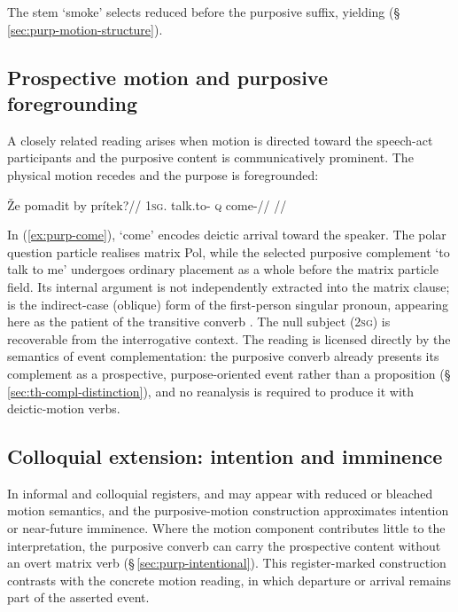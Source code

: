 The stem  `smoke' selects reduced  before the
purposive suffix, yielding  (§\,\ref{sec:purp-motion-structure}).

\subsection{Prospective motion and purposive
foregrounding}\label{sec:purp-motion-prospective}

A closely related reading arises when motion is directed toward the speech-act
participants and the purposive content is communicatively prominent. The
physical motion recedes and the purpose is foregrounded:

\ex\label{ex:purp-come}%
\begingl
\gla Že pomadit by prítek?//
\glb \textsc{1sg}.\Ind{} talk.to-\Purp{} \textsc{q} come-\Pf{}//
\glft {}//
\endgl
\xe

In (\ref{ex:purp-come}),  `come' encodes deictic arrival toward the
speaker. The polar question particle  realises matrix Pol, while
the selected purposive complement  `to talk to me' undergoes
ordinary placement as a whole before the matrix particle field. Its internal
argument is not independently extracted into the matrix clause;  is the indirect-case (oblique) form of the first-person singular
pronoun, appearing here as the patient of the transitive converb .
The null subject (\textsc{2sg}) is recoverable from the interrogative context.
The reading is licensed directly by the semantics of event complementation: the
purposive converb already presents its complement as a prospective,
purpose-oriented event rather than a proposition
(§\,\ref{sec:th-compl-distinction}), and no reanalysis is required to produce it
with deictic-motion verbs.

\subsection{Colloquial extension: intention and
imminence}\label{sec:purp-motion-colloquial}

In informal and colloquial registers,  and  may appear
with reduced or bleached motion semantics, and the purposive-motion construction
approximates intention or near-future imminence. Where the motion component
contributes little to the interpretation, the purposive converb can carry the
prospective content without an overt matrix verb
(§\,\ref{sec:purp-intentional}). This register-marked construction contrasts
with the concrete motion reading, in which departure or arrival remains part of
the asserted event.


